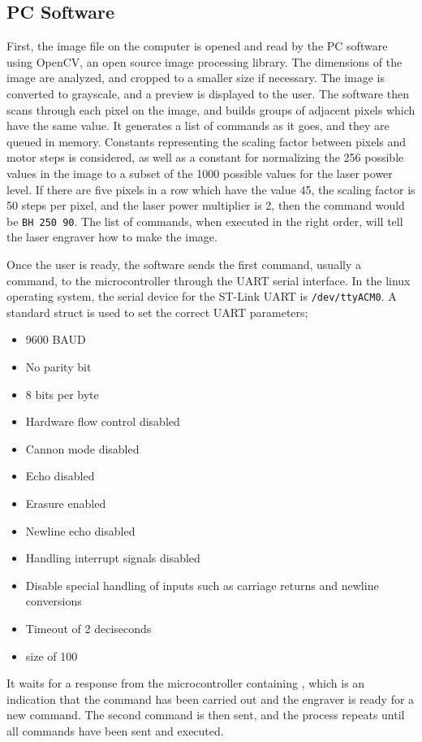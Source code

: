 \documentclass[11pt]{LaTeX-Classes/math-hw}
\begin{document}
\subsection{PC Software}
First, the image file on the computer is opened and read by the PC software using OpenCV, an open source
image processing library. The dimensions of the image are analyzed, and cropped to a smaller size
if necessary.
The image is converted to grayscale, and a preview is displayed to the user.
The software then scans through each pixel on the image, and builds groups of adjacent pixels
which have the same value. It generates a list of commands as it goes, and they are queued in memory.
Constants representing the scaling factor between pixels and motor steps is considered, as well
as a constant for normalizing the 256 possible values in the image to a subset of the 1000 possible
values for the laser power level.
If there are five pixels in a row which have the value 45, the scaling factor is 50 steps
per pixel, and the laser power multiplier is 2, then the command would be \texttt{BH 250 90}.
The list of commands, when executed in the right order, will tell the laser engraver how to make the image.

Once the user is ready, the software sends the first command, usually a  command, to the
microcontroller through the UART serial interface.
In the linux operating system, the serial device for the ST-Link UART is \texttt{/dev/ttyACM0}.
A standard  struct is used to set the correct UART parameters;
\begin{itemize}
  \item 9600 BAUD
  \item No parity bit
  \item 8 bits per byte
  \item Hardware flow control disabled
  \item Cannon mode disabled
  \item Echo disabled
  \item Erasure enabled
  \item Newline echo disabled
  \item Handling interrupt signals disabled
  \item Disable special handling of inputs such as carriage returns and newline conversions
  \item Timeout of 2 deciseconds
  \item {} size of 100
\end{itemize}

It waits for a response from the microcontroller containing ,
which is an indication that the command has been
carried out and the engraver is ready for a new command.
The second command is then sent, and the process repeats until all commands have been sent and executed.
\end{document}
